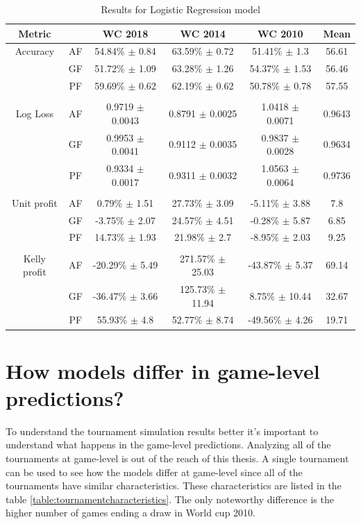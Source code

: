 \begin{table}
    \caption{Results for Logistic Regression model}
    \begin{tabular}{| c  c| c| c| c|c|}
        \hline
        Metric & & \textbf{WC 2018} & \textbf{WC 2014} & \textbf{WC 2010}& Mean\\
        \hline
        Accuracy & AF & 54.84\% $\pm$ 0.84 & 63.59\% $\pm$ 0.72 & 51.41\% $\pm$ 1.3& 56.61 \\
         & GF & 51.72\% $\pm$ 1.09 & 63.28\% $\pm$ 1.26 & 54.37\% $\pm$ 1.53& 56.46 \\
         & PF & 59.69\% $\pm$ 0.62 & 62.19\% $\pm$ 0.62 & 50.78\% $\pm$ 0.78& 57.55 \\
         & & & & & \\
        Log Loss & AF & 0.9719 $\pm$ 0.0043 & 0.8791 $\pm$ 0.0025 & 1.0418 $\pm$ 0.0071& 0.9643 \\
         & GF & 0.9953 $\pm$ 0.0041 & 0.9112 $\pm$ 0.0035 & 0.9837 $\pm$ 0.0028& 0.9634 \\
         & PF & 0.9334 $\pm$ 0.0017 & 0.9311 $\pm$ 0.0032 & 1.0563 $\pm$ 0.0064& 0.9736 \\
         & & & & & \\
        Unit profit & AF & 0.79\% $\pm$ 1.51 & 27.73\% $\pm$ 3.09 & -5.11\% $\pm$ 3.88& 7.8 \\
         & GF & -3.75\% $\pm$ 2.07 & 24.57\% $\pm$ 4.51 & -0.28\% $\pm$ 5.87& 6.85 \\
         & PF & 14.73\% $\pm$ 1.93 & 21.98\% $\pm$ 2.7 & -8.95\% $\pm$ 2.03& 9.25 \\
         & & & & & \\
        Kelly profit & AF & -20.29\% $\pm$ 5.49 & 271.57\% $\pm$ 25.03 & -43.87\% $\pm$ 5.37& 69.14 \\
         & GF & -36.47\% $\pm$ 3.66 & 125.73\% $\pm$ 11.94 & 8.75\% $\pm$ 10.44& 32.67 \\
         & PF & 55.93\% $\pm$ 4.8 & 52.77\% $\pm$ 8.74 & -49.56\% $\pm$ 4.26& 19.71 \\
 \hline
    \end{tabular}
    \label{table:linearmodel}
\end{table}

\section{How models differ in game-level predictions?}
To understand the tournament simulation results better it's important to understand what happens in the game-level predictions. Analyzing all of the tournaments at game-level is out of the reach of this thesis. A single tournament can be used to see how the models differ at game-level since all of the tournaments have similar characteristics. These characteristics are listed in the table \ref{table:tournamentcharacteristics}. The only noteworthy difference is the higher number of games ending a draw in World cup 2010.

